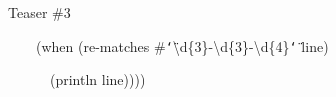 \documentclass{beamer}
\renewcommand{\textquotedbl}{\texttt{\char`\"}}
\begin{document}
\begin{frame}{Teaser \#3}
\begin{itemize}
\begin{small}
{\ttfamily\color{black}
\ \ \ \ \textcolor[rgb]{0.54901963,0.54901963,0.54901963}{(}\textcolor[rgb]{0.49803922,0.0,0.49803922}{when}
\textcolor[rgb]{0.54901963,0.54901963,0.54901963}{(}\textcolor[rgb]{0.28235295,0.23921569,0.54509807}{re-matches}
\#\textcolor[rgb]{0.54509807,0.13333334,0.32156864}{{\textquotedbl}{\textbackslash}d\{3\}-{\textbackslash}d\{3\}-{\textbackslash}d\{4\}{\textquotedbl}}
line\textcolor[rgb]{0.54901963,0.54901963,0.54901963}{)}}

{\ttfamily\color{black}
\ \ \ \ \ \ \textcolor[rgb]{0.54901963,0.54901963,0.54901963}{(}\textcolor[rgb]{0.28235295,0.23921569,0.54509807}{println}
line\textcolor[rgb]{0.54901963,0.54901963,0.54901963}{))))}}
\end{small}
  \end{itemize}
\end{frame}
\end{document}
